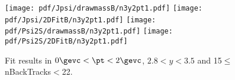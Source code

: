 \begin{figure}[H]
\begin{center}
\texttt{[image: pdf/Jpsi/drawmassB/n3y2pt1.pdf]}
\texttt{[image: pdf/Jpsi/2DFitB/n3y2pt1.pdf]}
\vspace*{-0.5cm}
\texttt{[image: pdf/Psi2S/drawmassB/n3y2pt1.pdf]}
\texttt{[image: pdf/Psi2S/2DFitB/n3y2pt1.pdf]}
\vspace*{-0.5cm}
\end{center}
\caption{Fit results in $0\gevc<\pt<2\gevc$, $2.8<y<3.5$ and 15$\leq$nBackTracks$<$22.}
\label{Fitn3y2pt1}
\end{figure}
